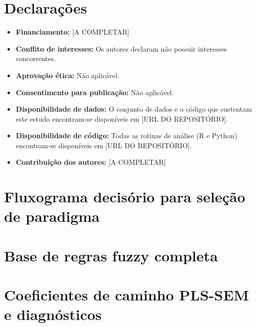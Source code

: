 \documentclass[pdflatex,sn-basic]{sn-jnl}%
\begin{document}
\section*{Declarações}

\begin{itemize}
\item \textbf{Financiamento:} [A COMPLETAR]
\item \textbf{Conflito de interesses:} Os autores declaram não possuir interesses concorrentes.
\item \textbf{Aprovação ética:} Não aplicável.
\item \textbf{Consentimento para publicação:} Não aplicável.
\item \textbf{Disponibilidade de dados:} O conjunto de dados e o código que sustentam este estudo encontram-se disponíveis em [URL DO REPOSITÓRIO].
\item \textbf{Disponibilidade de código:} Todas as rotinas de análise (R e Python) encontram-se disponíveis em [URL DO REPOSITÓRIO].
\item \textbf{Contribuição dos autores:} [A COMPLETAR]
\end{itemize}

\begin{appendices}

\section{Fluxograma decisório para seleção de paradigma}\label{secA1}


\section{Base de regras fuzzy completa}\label{secA2}


\section{Coeficientes de caminho PLS-SEM e diagnósticos}\label{secA3}


\end{appendices}

\end{document}
